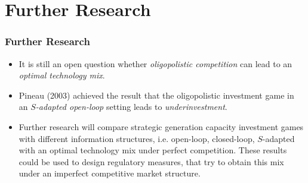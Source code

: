 \section{Further Research}

\begin{frame}
\frametitle{Further Research}
\begin{itemize}
	\item It is still an open question whether \emph{oligopolistic competition} can lead to an \emph{optimal technology mix}.
	\item Pineau (2003) achieved the result that the oligopolistic investment game in an \emph{$S$-adapted open-loop} setting leads to \emph{underinvestment}. %
\end{itemize}
\vspace{0.3cm}
\begin{itemize}
	\item Further research will compare strategic generation capacity investment games with different information structures, i.e. open-loop, closed-loop, $S$-adapted with an optimal technology mix under perfect competition. These results could be used to design regulatory measures, that try to obtain this mix under an imperfect competitive market structure.
\end{itemize}

\end{frame}
